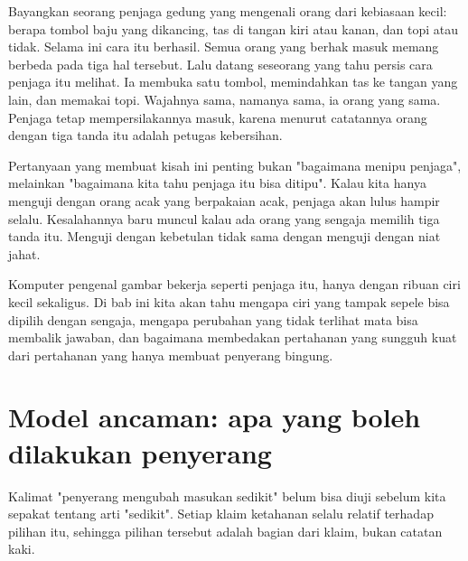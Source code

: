 \begin{untukanak}
Bayangkan seorang penjaga gedung yang mengenali orang dari kebiasaan kecil: berapa
tombol baju yang dikancing, tas di tangan kiri atau kanan, dan topi atau tidak.
Selama ini cara itu berhasil. Semua orang yang berhak masuk memang berbeda pada tiga
hal tersebut. Lalu datang seseorang yang tahu persis cara penjaga itu melihat. Ia
membuka satu tombol, memindahkan tas ke tangan yang lain, dan memakai topi. Wajahnya
sama, namanya sama, ia orang yang sama. Penjaga tetap mempersilakannya masuk, karena
menurut catatannya orang dengan tiga tanda itu adalah petugas kebersihan.

Pertanyaan yang membuat kisah ini penting bukan "bagaimana menipu penjaga", melainkan
"bagaimana kita tahu penjaga itu bisa ditipu". Kalau kita hanya menguji dengan orang
acak yang berpakaian acak, penjaga akan lulus hampir selalu. Kesalahannya baru muncul
kalau ada orang yang sengaja memilih tiga tanda itu. Menguji dengan kebetulan tidak
sama dengan menguji dengan niat jahat.

Komputer pengenal gambar bekerja seperti penjaga itu, hanya dengan ribuan ciri kecil
sekaligus. Di bab ini kita akan tahu mengapa ciri yang tampak sepele bisa dipilih
dengan sengaja, mengapa perubahan yang tidak terlihat mata bisa membalik jawaban,
dan bagaimana membedakan pertahanan yang sungguh kuat dari pertahanan yang hanya
membuat penyerang bingung.
\end{untukanak}

\section{Model ancaman: apa yang boleh dilakukan penyerang}

Kalimat "penyerang mengubah masukan sedikit" belum bisa diuji sebelum kita sepakat
tentang arti "sedikit". Setiap klaim ketahanan selalu relatif terhadap pilihan itu,
sehingga pilihan tersebut adalah bagian dari klaim, bukan catatan kaki.


